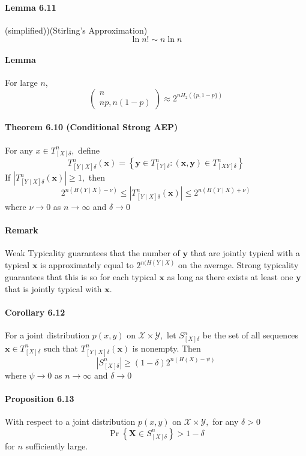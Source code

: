 \documentclass[8pt]{article}
\begin{document}
\paragraph{Lemma 6.11} (simplified))(Stirling’s Approximation) 
$$\ln n ! \sim n \ln n$$
\paragraph{Lemma} For large $n$,
$$
\left(\begin{array}{c}
n \\
n p, n(1-p)
\end{array}\right) \approx 2^{n H_{2}(\{p, 1-p\})}
$$

\paragraph{Theorem 6.10 (Conditional Strong AEP)} For any $x \in T_{[X] \delta}^{n},$ define
$$
T_{[Y \mid X] \delta}^{n}(\mathbf{x})=\left\{\mathbf{y} \in T_{[Y] \delta}^{n}:(\mathbf{x}, \mathbf{y}) \in T_{[X Y] \delta}^{n}\right\}
$$
If $\left|T_{[Y \mid X] \delta}^{n}(\mathbf{x})\right| \geq 1,$ then
$$
2^{n(H(Y \mid X)-\nu)} \leq\left|T_{[Y \mid X] \delta}^{n}(\mathbf{x})\right| \leq 2^{n(H(Y \mid X)+\nu)}
$$
where $\nu \rightarrow 0$ as $n \rightarrow \infty$ and $\delta \rightarrow 0$
\paragraph{Remark} Weak Typicality guarantees that the number of $\mathbf{y}$ that are jointly typical with a typical $\mathbf{x}$ is approximately equal to $2^{n(H(Y \mid X)}$ on the average. Strong typicality guarantees that this is so for each typical $\mathbf{x}$ as long as there exists at least one $\mathbf{y}$ that is jointly typical with $\mathbf{x}$.

\paragraph{Corollary 6.12} For a joint distribution $p(x, y)$ on $\mathcal{X} \times \mathcal{Y},$ let $S_{[X] \delta}^{n}$ be the set of all sequences $\mathbf{x} \in T_{[X] \delta}^{n}$ such that $T_{[Y \mid X] \delta}^{n}(\mathbf{x})$ is nonempty. Then
$$
\left|S_{[X] \delta}^{n}\right| \geq(1-\delta) 2^{n(H(X)-\psi)}
$$
where $\psi \rightarrow 0$ as $n \rightarrow \infty$ and $\delta \rightarrow 0$

\paragraph{Proposition 6.13} With respect to a joint distribution $p(x, y)$ on $\mathcal{X} \times \mathcal{Y},$ for any $\delta>0$
$$
\operatorname{Pr}\left\{\mathbf{X} \in S_{[X] \delta}^{n}\right\}>1-\delta
$$
for $n$ sufficiently large.
\end{document}
